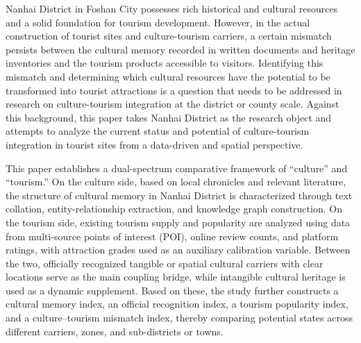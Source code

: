 \begin{abstract*}
Nanhai District in Foshan City possesses rich historical and cultural resources and a solid foundation for tourism development. However, in the actual construction of tourist sites and culture-tourism carriers, a certain mismatch persists between the cultural memory recorded in written documents and heritage inventories and the tourism products accessible to visitors. Identifying this mismatch and determining which cultural resources have the potential to be transformed into tourist attractions is a question that needs to be addressed in research on culture-tourism integration at the district or county scale. Against this background, this paper takes Nanhai District as the research object and attempts to analyze the current status and potential of culture-tourism integration in tourist sites from a data-driven and spatial perspective.

This paper establishes a dual-spectrum comparative framework of ``culture'' and ``tourism.'' On the culture side, based on local chronicles and relevant literature, the structure of cultural memory in Nanhai District is characterized through text collation, entity-relationship extraction, and knowledge graph construction. On the tourism side, existing tourism supply and popularity are analyzed using data from multi-source points of interest (POI), online review counts, and platform ratings, with attraction grades used as an auxiliary calibration variable. Between the two, officially recognized tangible or spatial cultural carriers with clear locations serve as the main coupling bridge, while intangible cultural heritage is used as a dynamic supplement. Based on these, the study further constructs a cultural memory index, an official recognition index, a tourism popularity index, and a culture--tourism mismatch index, thereby comparing potential states across different carriers, zones, and sub-districts or towns.


\end{abstract*}
